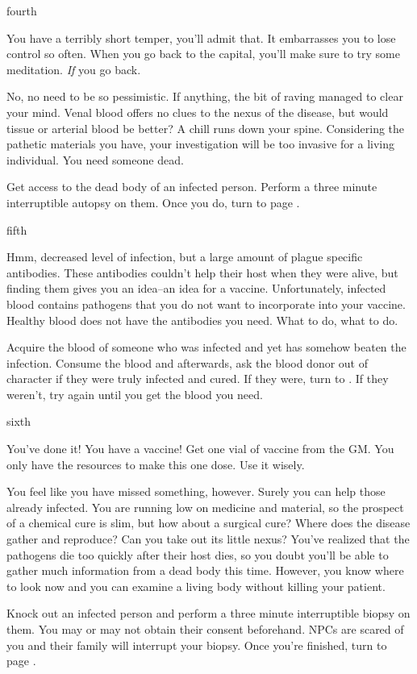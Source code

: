 \documentclass[greennotebook]{Pestilence} %
\begin{document}
\begin{page}{fourth}

You have a terribly short temper, you'll admit that. It embarrasses you to lose control so often. When you go back to the capital, you'll make sure to try some meditation. \textit{If} you go back.

No, no need to be so pessimistic. If anything, the bit of raving managed to clear your mind. Venal blood offers no clues to the nexus of the disease, but would tissue or arterial blood be better? A chill runs down your spine. Considering the pathetic materials you have, your investigation will be too invasive for a living individual. You need someone dead.

Get access to the dead body of an infected person. Perform a three minute interruptible autopsy on them. Once you do, turn to page .

\end{page}

\begin{page}{fifth}

Hmm, decreased level of infection, but a large amount of plague specific antibodies. These antibodies couldn't help their host when they were alive, but finding them gives you an idea--an idea for a vaccine. Unfortunately, infected blood contains pathogens that you do not want to incorporate into your vaccine. Healthy blood does not have the antibodies you need. What to do, what to do.

Acquire the blood of someone who was infected and yet has somehow beaten the infection. Consume the blood and afterwards, ask the blood donor out of character if they were truly infected and cured. If they were, turn to . If they weren't, try again until you get the blood you need.

\end{page}

\begin{page}{sixth}

You've done it! You have a vaccine! Get one vial of vaccine from the GM. You only have the resources to make this one dose. Use it wisely.

You feel like you have missed something, however. Surely you can help those already infected. You are running low on medicine and material, so the prospect of a chemical cure is slim, but how about a surgical cure? Where does the disease gather and reproduce? Can you take out its little nexus? You've realized that the pathogens die too quickly after their host dies, so you doubt you'll be able to gather much information from a dead body this time. However, you know where to look now and you can examine a living body without killing your patient.

Knock out an infected person and perform a three minute interruptible biopsy on them. You may or may not obtain their consent beforehand. NPCs are scared of you and their family will interrupt your biopsy. Once you're finished, turn to page .

\end{page}
\end{document}
